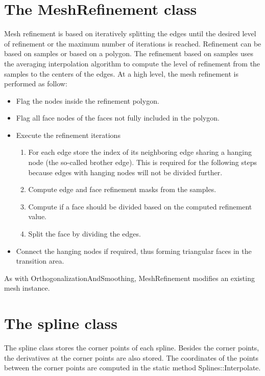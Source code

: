 \documentclass[biblatex]{deltares_manual}
\begin{document}
\chapter{The MeshRefinement class}

Mesh refinement is based on iteratively splitting the edges until the desired level of refinement or the maximum number of iterations is reached. Refinement can be based on samples or based on a polygon. The refinement based on samples uses the averaging interpolation algorithm to compute the level of refinement from the samples to the centers of the edges.
At a high level, the mesh refinement is performed as follow:
\begin{itemize}
\item Flag the nodes inside the refinement polygon.
\item Flag all face nodes of the faces not fully included in the polygon.
\item Execute the refinement iterations
\begin{enumerate}
\item For each edge store the index of its neighboring edge sharing a hanging node (the so-called brother edge). This is required for the following steps because edges with hanging nodes will not be divided further.
\item Compute edge and face refinement masks from the samples.
\item Compute if a face should be divided based on the computed refinement value.
\item Split the face by dividing the edges.
\end{enumerate}
\item Connect the hanging nodes if required, thus forming triangular faces in the transition area.
\end{itemize}
As with OrthogonalizationAndSmoothing, MeshRefinement modifies an existing mesh instance.
\chapter{The spline class}

The spline class stores the corner points of each spline. Besides the corner points, the derivatives at the corner points are also stored. The coordinates of the points between the corner points are computed in the static method Splines::Interpolate.
\end{document}
